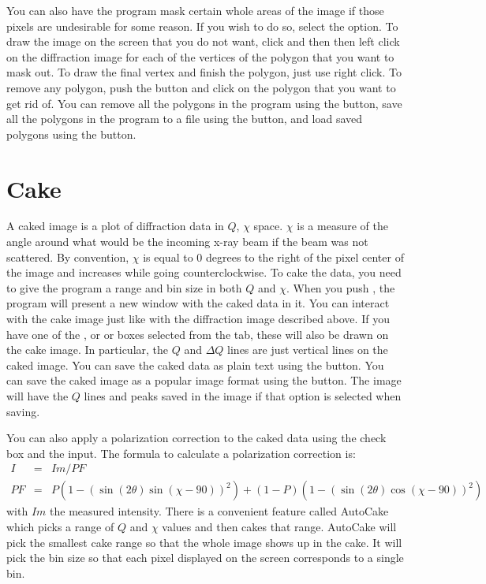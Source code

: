 You can also have the program mask certain whole areas 
of the image if those pixels are undesirable for some 
reason. If you wish to do so, select the 
 option. To draw the image on the
screen that you do not want, click  and
then then left click on the diffraction image for each 
of the vertices of the polygon that you want to mask out.
To draw the final vertex and finish the polygon, just
use right click. To remove any polygon, push the 
 button and click on the polygon that
you want to get rid of. You can remove all the polygons
in the program using the  button, save
all the polygons in the program to a file using the
 button, and load saved polygons using
the  button.

\section{Cake}
\index{$\chi$}
A caked image is a plot of diffraction data in $Q$, 
$\chi$ space. $\chi$ is a measure of the angle around 
what would be the incoming x-ray beam if the beam was 
not scattered. By convention, $\chi$ is equal to 0
degrees to the right of the pixel center of the image 
and increases while going counterclockwise. To cake the
data, you need to give the program a range and bin size 
in both $Q$ and $\chi$. When you push , the
program will present a new window with the caked data in
it. You can interact with the cake image just like with
the diffraction image described above. If you have one of
the , or  or 
 boxes selected from the  
tab, these will also be drawn on the cake image. In particular,
the $Q$ and $\Delta Q$ lines are just vertical lines on the
caked image. You can save the caked data as plain text 
using the  button. You can save the caked 
image as a popular image format using the 
button. The image will have the $Q$ lines and peaks saved
in the image if that option is selected when saving.

You can also apply a polarization correction to the caked
data using the  check box
and the  input. The formula to calculate a 
polarization correction is:
\begin{eqnarray}
    I&=&Im/PF \\ 
    PF&=&P(1 - (\sin(2\theta)\sin(\chi-90))^2) + 
    (1 - P)(1 - (\sin(2\theta)\cos(\chi-90))^2)
\end{eqnarray}
with $Im$ the measured intensity. There is a convenient
feature called AutoCake which picks a range of $Q$ and $\chi$ 
values and then cakes that range. AutoCake will pick the
smallest cake range so that the whole image shows up in
the cake. It will pick the bin size so that each pixel 
displayed on the screen corresponds to a single bin.

